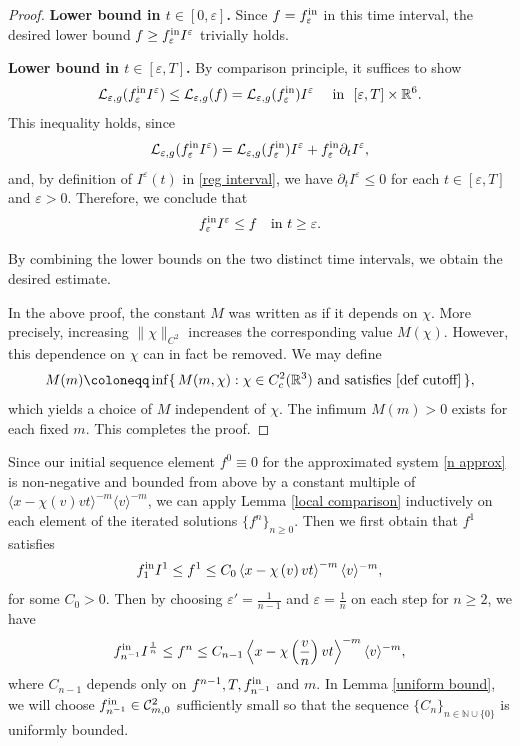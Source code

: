 \documentclass[reqno,11pt,final]{amsart}
\theoremstyle{plain}
\numberwithin{equation}{section}
\numberwithin{theorem}{section}
\begin{document}
\begin{proof}
\textbf{Lower bound in $t\in[0,\varepsilon]$.} Since $f=f^\textup{in}_\varepsilon$ in this time interval, the desired lower bound $f\ge f^\textup{in}_\varepsilon I^\varepsilon$ trivially holds.

\textbf{Lower bound in $t\in[\varepsilon, T]$.} By comparison principle, it suffices to show 
\begin{align*}
\mathcal{L}_{\varepsilon,g}(f^\textup{in}_\varepsilon I^\varepsilon) \le \mathcal{L}_{\varepsilon,g}(f)=\mathcal{L}_{\varepsilon,g}(f^\textup{in}_\varepsilon)I^\varepsilon \quad \textup{ in }\,\, [\varepsilon, T]\times\mathbb{R}^6.
\end{align*}This inequality holds, since $$\mathcal{L}_{\varepsilon,g}(f^\textup{in}_\varepsilon I^\varepsilon) =\mathcal{L}_{\varepsilon,g}(f^\textup{in}_\varepsilon)I^\varepsilon+ f^\textup{in}_\varepsilon\partial_t I^\varepsilon, $$ and, by definition of $I^\varepsilon(t)$ in \eqref{reg interval}, we have $\partial_tI^\varepsilon \le0$ for each $t\in[\varepsilon,T]$ and  $\varepsilon>0$. Therefore, we conclude that
\begin{align*}
f^\textup{in}_\varepsilon I^\varepsilon \le f \quad \textup{in}\,\, t\ge\varepsilon.
\end{align*}

By combining the lower bounds on the two distinct time intervals, we obtain the desired estimate.

In the above proof, the constant $M$ was written as if it depends on $\chi$. More precisely, increasing $\|\chi\|_{C^{2}}$ increases the corresponding value $M(\chi)$. However, this dependence on $\chi$ can in fact be removed. We may define
$$
    M(m) \coloneqq \inf\{\, M(m,\chi) : \chi\in C_c^2(\mathbb{R}^3) \textup{ and satisfies }\eqref{def cutoff}\,\},
$$
which yields a choice of $M$ independent of $\chi$. The infimum $M(m)>0$ exists for each fixed $m$. This completes the proof.
\end{proof}


Since our initial sequence element $f^0\equiv0$ for the approximated system \eqref{n approx} is non-negative and bounded from above by a constant multiple of $\langle x - \chi(v)vt\rangle^{-m}\langle v\rangle^{-m}$, we can apply Lemma \ref{local comparison} inductively on each element of the iterated solutions $\{f^n\}_{n\ge 0}$. Then we first obtain that $f^1$ satisfies
\begin{align}\label{C_1}
f^\textup{in}_1 I^{1}\le f^1 \le C_{0} \left\langle x - \chi\left(v\right)vt\right\rangle^{-m} \langle v\rangle^{-m},
\end{align}for some $C_0>0$. Then by choosing $\varepsilon'=\frac{1}{n-1}$ and $\varepsilon=\frac{1}{n}$ on each step for $n\ge 2$, we have 
\begin{align}\label{C_n}
f^\textup{in}_{n^{-1}} I^{\frac{1}{n}}\le f^n \le C_{n-1} \left\langle x - \chi\left(\frac{v}{n}\right)vt\right\rangle^{-m} \langle v\rangle^{-m},
\end{align}where $C_{n-1}$ depends only on $f^{n-1}, T, f^\textup{in}_{n^{-1}}$ and $m$. In Lemma \ref{uniform bound}, we will choose $f^\textup{in}_{n^{-1}}\in \mathcal{C}^2_{m,0}$ sufficiently small so that the sequence $\{C_n\}_{n\in\mathbb{N}\cup \{0\}}$ is uniformly bounded.
\end{document}
